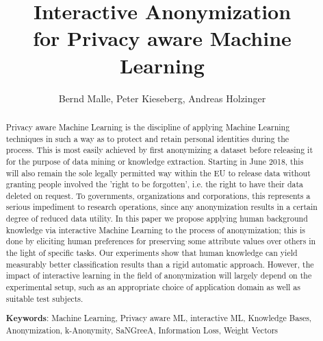 \documentclass{llncs}
\begin{document}
\title{Interactive Anonymization\\
for Privacy aware Machine Learning}

\author{Bernd Malle, Peter Kieseberg, Andreas Holzinger}

	
\maketitle

\begin{abstract}

Privacy aware Machine Learning is the discipline of applying Machine Learning techniques in such a way as to protect and retain personal identities during the process. This is most easily achieved by first anonymizing a dataset before releasing it for the purpose of data mining or knowledge extraction. Starting in June 2018, this will also remain the sole legally permitted way within the EU to release data without granting people involved the 'right to be forgotten', i.e. the right to have their data deleted on request. To governments, organizations and corporations, this represents a serious impediment to research operations, since any anonymization results in a certain degree of reduced data utility. In this paper we propose applying human background knowledge via interactive Machine Learning to the process of anonymization; this is done by eliciting human preferences for preserving some attribute values over others in the light of specific tasks. Our experiments show that human knowledge can yield measurably better classification results than a rigid automatic approach. However, the impact of interactive learning in the field of anonymization will largely depend on the experimental setup, such as an appropriate choice of application domain as well as suitable test subjects.


\medskip

\textbf{Keywords}: Machine Learning, Privacy aware ML, interactive ML, Knowledge Bases, Anonymization, k-Anonymity, SaNGreeA, Information Loss, Weight Vectors


\end{abstract}
\end{document}
